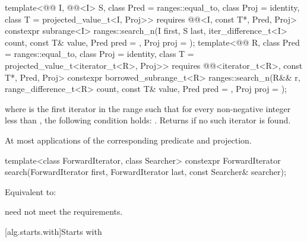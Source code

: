 %
\begin{itemdecl}
template<@@ I, @@<I> S,
         class Pred = ranges::equal_to, class Proj = identity,
         class T = projected_value_t<I, Proj>>
  requires @@<I, const T*, Pred, Proj>
  constexpr subrange<I>
    ranges::search_n(I first, S last, iter_difference_t<I> count,
                     const T& value, Pred pred = {}, Proj proj = {});
template<@@ R, class Pred = ranges::equal_to,
         class Proj = identity, class T = projected_value_t<iterator_t<R>, Proj>>
  requires @@<iterator_t<R>, const T*, Pred, Proj>
  constexpr borrowed_subrange_t<R>
    ranges::search_n(R&& r, range_difference_t<R> count,
                     const T& value, Pred pred = {}, Proj proj = {});
\end{itemdecl}

\begin{itemdescr}
\pnum
\returns
{}
where  is the first iterator in the range 
such that for every non-negative integer  less than ,
the following condition holds:
.
Returns  if no such iterator is found.

\pnum
\complexity
At most  applications
of the corresponding predicate and projection.
\end{itemdescr}

%
\begin{itemdecl}
template<class ForwardIterator, class Searcher>
  constexpr ForwardIterator
    search(ForwardIterator first, ForwardIterator last, const Searcher& searcher);
\end{itemdecl}

\begin{itemdescr}
\pnum
\effects
Equivalent to: 

\pnum
\remarks
{} need not meet the  requirements.
\end{itemdescr}

[alg.starts.with]{Starts with}

